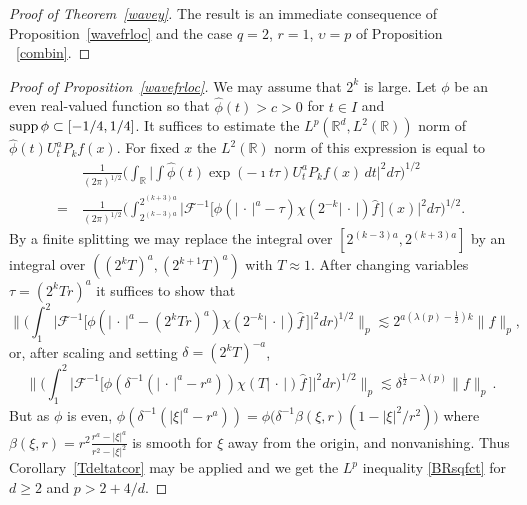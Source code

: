 \documentclass[11pt]{amsart}
\theoremstyle{definition}
\numberwithin{theorem}{section}
\numberwithin{definition}{section}
\renewcommand{\wp}{\upsilon}
\def\im{\imath}
\newcommand{\Be}{\begin{equation}}
\newcommand{\Ee}{\end{equation}}
\newcommand{\note}[1]{\footnote{\texttt{\Small #1}}}
\def\supp{{\text{\rm supp}\,}}
\def\lc{\lesssim}
\def\la{\lambda}             \def\La{\Lambda}
\def\bbR{{\mathbb {R}}}
\def\cF{{\mathcal {F}}}
\begin{document}
\begin{proof} [Proof of Theorem~\ref{wavey}]
The result is an immediate consequence of
Proposition~\ref{wavefrloc} and the case  $q=2$, $r=1$, $\wp=p$
of
Proposition ~\ref{combin}.
\end{proof}


\begin{proof} [Proof of Proposition~\ref{wavefrloc}]
We may assume that  $2^k$ is large.
Let $\phi$ be an even real-valued  function
so that
$\widehat \phi(t)>c>0$ for $t\in I$ and $\supp \phi\subset [-1/4,1/4]$.
It suffices to estimate the $L^p(\bbR^d,L^2(\bbR))$ norm of
$\widehat\phi(t)U^a_t P_kf(x)$.
For fixed $x$ the $L^2(\bbR)$ norm of this expression is equal to
\begin{align*}
&\frac{1}{(2\pi)^{1/2}}
\Big(\int_{\bbR}\Big| \int \widehat \phi(t) \exp(-\im t\tau)
U^a_t P_kf(x) \,dt\Big|^2 d\tau\Big)^{1/2}
\\
=\ &\frac{1}{(2\pi)^{1/2}} \Big(\int_{2^{(k-3)a}}^{2^{(k+3)a}}\Big| \cF^{-1} \big[
\phi(|\,\cdot\,|^a-\tau) \chi(2^{-k}|\,\cdot\,|)\widehat f \,\big](x)\Big|^2 d\tau \Big)^{1/2}.
\end{align*}
By a finite splitting
we may replace
the integral over $[2^{(k-3)a}, 2^{(k+3) a}]$ by an integral over $((2^kT)^a,
(2^{k+1}T)^a)$ with $T\approx 1$. After changing variables $\tau=(2^kT r)^a$ it suffices to
show that
$$
\Big\| \Big(\int_{1}^2\Big| \cF^{-1} \big[
\phi(|\,\cdot\,|^a-(2^kTr)^a) \chi(2^{-k}|\,\cdot\,|)\widehat f \,\big]\Big|^2 dr\Big)^{1/2}\Big\|_p\lc 2^{a(\la(p)-\frac 12) k} \|f\|_{p},
$$
or, after scaling and setting $\delta= (2^{k}T)^{-a}$,
\Be\label{BRsqfct}
\Big\| \Big(\int_{1}^2\Big| \cF^{-1} \big[
\phi( \delta^{-1} (|\,\cdot\,|^a-r^a))
\chi(T|\,\cdot\,|)\widehat f\,\big]\Big|^2 dr\Big)^{1/2}\Big\|_p\lc \delta^{\frac 12-\la(p)} \|f\|_{p}\,.
\Ee
But as $\phi$ is even,
$\phi( \delta^{-1} (|\xi|^a-r^a))  =\phi\big(\delta^{-1} \beta(\xi,r)
(1-|\xi|^2/r^2)\big)
$ where $\beta(\xi,r)= r^2\frac{r^a-|\xi|^a}{r^2-|\xi|^2}$ is smooth for $\xi$ away from the origin, and nonvanishing.
Thus Corollary~\ref{Tdeltatcor}
may be applied and  we get the $L^p$ inequality
\eqref{BRsqfct} for $d\ge 2$ and $p>2 +4/d$.


\end{proof}
\end{document}
